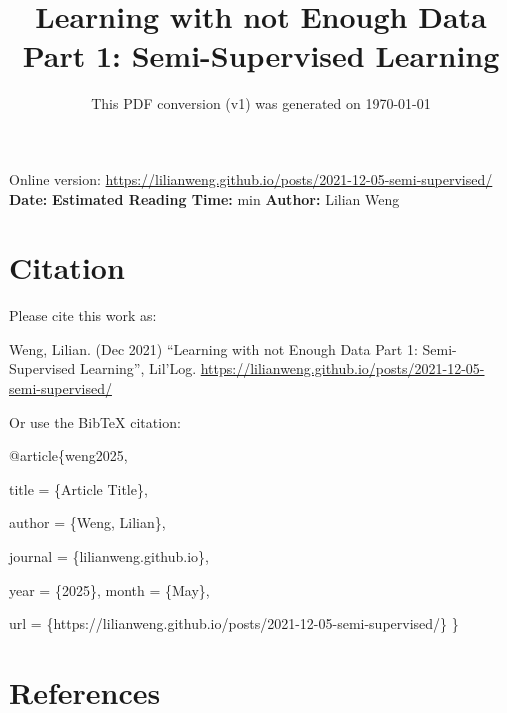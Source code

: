 \documentclass[12pt]{article}
\title{Learning with not Enough Data Part 1: Semi-Supervised Learning}
\date{This PDF conversion (v1) was generated on \today\footnotemark}
\begin{document}
\maketitle
\begin{center}
    Online version: \url{https://lilianweng.github.io/posts/2021-12-05-semi-supervised/} \\
    \textbf{Date:} \quad
    \textbf{Estimated Reading Time:}  min \quad
    \textbf{Author:} Lilian Weng
\end{center}




\newpage
\tableofcontents
\newpage
\vspace{1em}
\n\n\n\section{Citation}
Please cite this work as:

\begin{tcolorbox}[colback=black!5!white, colframe=black!80!white, boxrule=0.5pt, arc=2mm, left=1mm, right=1mm, top=1mm, bottom=1mm]
  Weng, Lilian. (Dec 2021) ``Learning with not Enough Data Part 1: Semi-Supervised Learning'', Lil'Log. \url{https://lilianweng.github.io/posts/2021-12-05-semi-supervised/}
  \end{tcolorbox}

Or use the BibTeX citation:

\begin{tcolorbox}[
    colback=black!5!white,
    colframe=black!80!white,
    boxrule=0.5pt,
    arc=2mm,
    left=1mm,
    right=1mm,
    top=1mm,
    bottom=1mm,
    listing only,
    listing options={
      basicstyle=\ttfamily\footnotesize,
      breaklines=true,
      literate={\{}{{\char`\{}}1 {\}}{{\char`\}}}1
    }
  ]
  @article\{weng2025,

    title   = \{Article Title\},

    author  = \{Weng, Lilian\},

    journal = \{lilianweng.github.io\},

    year    = \{2025\},
    month   = \{May\},

    url     = \{https://lilianweng.github.io/posts/2021-12-05-semi-supervised/\}\n
  \}
  \end{tcolorbox}

\newpage
\section{References}

\n
\end{document}
